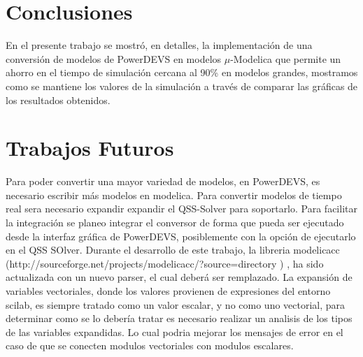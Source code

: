
\section{Conclusiones}

	En el presente trabajo se mostró, en detalles, la implementación de una conversión de modelos de PowerDEVS en modelos $\mu$-Modelica que permite un ahorro 
	en el tiempo de simulación cercana al 90\% en modelos grandes, mostramos como se mantiene los valores de la simulación a través de comparar las gráficas de 
	los resultados obtenidos.

\section{Trabajos Futuros}
	Para poder convertir una mayor variedad de modelos, en PowerDEVS, es necesario escribir más modelos en modelica.
	Para convertir modelos de tiempo real sera necesario expandir expandir el QSS-Solver para soportarlo.
	Para facilitar la integración se planeo integrar el conversor de forma que pueda ser ejecutado desde la interfaz gráfica de PowerDEVS, posiblemente con la opción de ejecutarlo en el QSS SOlver.
	Durante el desarrollo de este trabajo, la libreria modelicacc (http://sourceforge.net/projects/modelicacc/?source=directory ) , ha sido actualizada con un nuevo parser, el cual deberá ser remplazado.
	La expansión de variables vectoriales, donde los valores provienen de expresiones del entorno scilab, es siempre tratado como un valor escalar, y no como uno vectorial, para determinar como se lo debería tratar es necesario realizar un analisis de los tipos de las variables expandidas. Lo cual podria mejorar los mensajes de error en el caso de que se conecten modulos vectoriales con modulos escalares.
